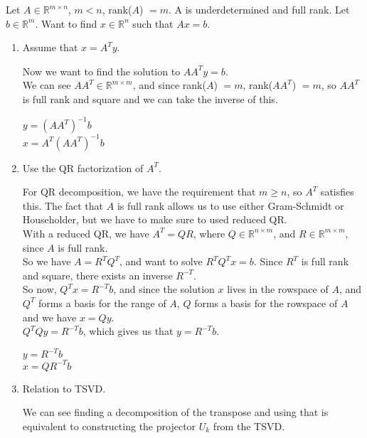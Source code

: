 \documentclass[12pt]{article}
\newenvironment{exercise}[2][Exercise]{\begin{trivlist}
\item[\hskip \labelsep{\bfseries #1}\hskip \labelsep{\bfseries #2.}]}{\end{trivlist}}
\begin{document}
\begin{exercise}{2} Let $A \in \mathbb{R}^{m \times n}$, $m < n$, rank($A$) $= m$.
  A is underdetermined and full rank. Let $b \in \mathbb{R}^m$.
  Want to find $x \in \mathbb{R}^n$ such that $Ax = b$.

  \begin{enumerate}[label=(\alph*)]

    \item Assume that $x = A^Ty$.

      Now we want to find the solution to $AA^Ty = b$. \\
      We can see $AA^T \in \mathbb{R}^{m \times m}$, and since rank($A$) $= m$,
      rank($AA^T$) $= m$, so $AA^T$ is full rank and square and we can take
      the inverse of this.

      \begin{center}
        $y = (A A^T)^{-1} b$ \\
        $x = A^T (A A^T)^{-1} b$ \\
      \end{center}

    \item Use the QR factorization of $A^T$.

      For QR decomposition, we have the requirement that $m \geq n$, so $A^T$
      satisfies this. The fact that $A$ is full rank allows us to use either
      Gram-Schmidt or Householder, but we have to make sure to used reduced QR. \\
      With a reduced QR, we have $A^T = QR$, where $Q \in \mathbb{R}^{n \times m}$,
      and $R \in \mathbb{R}^{m \times m}$, since $A$ is full rank. \\
      So we have $A = R^T Q^T$, and want to solve $R^T Q^T x = b$.
      Since $R^T$ is full rank and square, there exists an inverse $R^{-T}$. \\
      So now, $Q^T x = R^{-T} b$, and since the solution $x$ lives in the rowspace
      of $A$, and $Q^T$ forms a basis for the range of $A$, $Q$ forms a basis
      for the rowspace of $A$ and we have $x = Q y$. \\
      $ Q^T Q y = R^{-T} b$, which gives us that $y = R^{-T} b$.

      \begin{center}
        $y = R^{-T} b$ \\
        $x = Q R^{-T} b$ \\
      \end{center}

    \item Relation to TSVD.

      We can see finding a decomposition of the transpose and using that is
      equivalent to constructing the projector $U_k$ from the TSVD.

  \end{enumerate}

\end{exercise}
\end{document}
